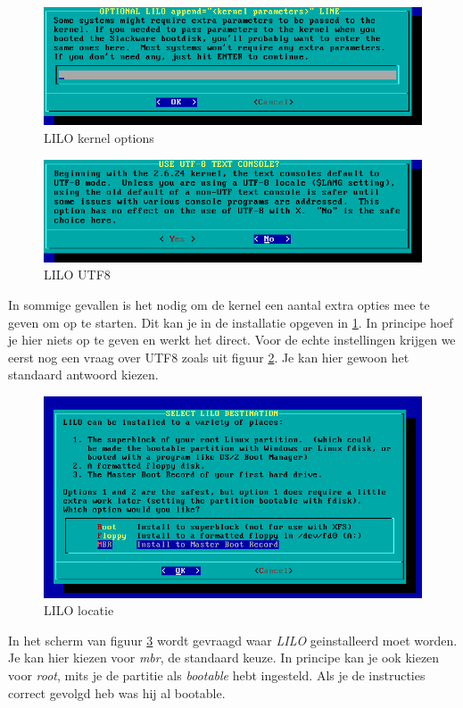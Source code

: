 \begin{figure}[H]
  \begin{center}
    \includegraphics[scale=0.5]{images/install_lilo3}
  \end{center}
  \caption{LILO kernel options}
  \label{fig:install_lilo3}
\end{figure}
\begin{figure}[H]
  \begin{center}
    \includegraphics[scale=0.5]{images/install_lilo4}
  \end{center}
  \caption{LILO UTF8}
  \label{fig:install_lilo4}
\end{figure}
In sommige gevallen is het nodig om de kernel een aantal extra opties mee te geven om op te starten. Dit kan je in de installatie opgeven in \ref{fig:install_lilo3}. In principe hoef je hier niets op te geven en werkt het direct. Voor de echte instellingen krijgen we eerst nog een vraag over UTF8 zoals uit figuur \ref{fig:install_lilo4}. Je kan hier gewoon het standaard antwoord kiezen.

\begin{figure}[H]
  \begin{center}
    \includegraphics[scale=0.5]{images/install_lilo5}
  \end{center}
  \caption{LILO locatie}
  \label{fig:install_lilo5}
\end{figure}
In het scherm van figuur \ref{fig:install_lilo5} wordt gevraagd waar \emph{LILO} geinstalleerd moet worden. Je kan hier kiezen voor \emph{mbr}, de standaard keuze. In principe kan je ook kiezen voor \emph{root}, mits je de partitie als \emph{bootable} hebt ingesteld. Als je de instructies correct gevolgd heb was hij al bootable.

